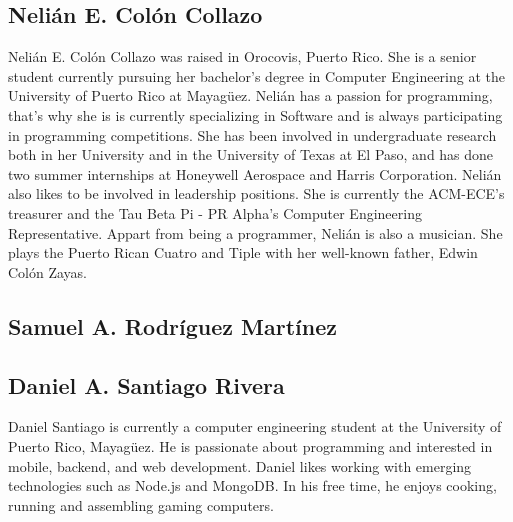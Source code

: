 
\subsection{Nelián E. Colón Collazo}
Nelián E. Colón Collazo was raised in Orocovis, Puerto Rico. She is a senior student currently pursuing her bachelor's degree in Computer Engineering at the University of Puerto Rico at Mayagüez.  Nelián has a passion for programming, that's why she is  is currently specializing in Software and is always participating in programming competitions. She has been involved in undergraduate research both in her University and in the University of Texas at El Paso, and has done two summer internships at Honeywell Aerospace and Harris Corporation. Nelián also likes to be involved in leadership positions. She is currently the ACM-ECE's treasurer and the Tau Beta Pi - PR Alpha's Computer Engineering Representative. Appart from being a programmer, Nelián is also a musician. She plays the Puerto Rican Cuatro and Tiple with her well-known father, Edwin Colón Zayas. 

\subsection{Samuel A. Rodríguez Martínez}

\subsection{Daniel A. Santiago Rivera}
Daniel Santiago is currently a computer engineering student at the University of Puerto Rico, Mayagüez. He is passionate about programming and interested in mobile, backend, and web development. Daniel likes working with emerging technologies such as Node.js and MongoDB. In his free time, he enjoys cooking, running and assembling gaming computers.


